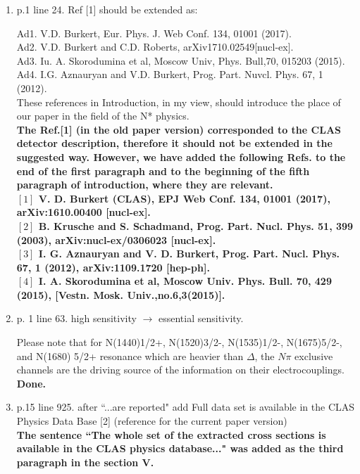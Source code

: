 \documentclass[,superscriptaddress,showpacs,amssymb,amsmath,amsfonts,linenumbers,article]{revtex4-1}
\begin{document}
\begin{enumerate}

\item p.1 line 24. Ref [1] should be extended as:

Ad1. V.D. Burkert, Eur. Phys. J. Web Conf. 134, 01001 (2017).\\
Ad2. V.D. Burkert and C.D. Roberts, arXiv1710.02549[nucl-ex].\\
Ad3. Iu. A. Skorodumina et al, Moscow Univ, Phys. Bull,70, 015203 (2015).\\
Ad4. I.G. Aznauryan and V.D. Burkert, Prog. Part. Nuvcl. Phys. 67, 1 (2012).\\[0.5cm]

These references in Introduction, in my view, should introduce the place of our paper in the field of the N* physics.\\
{\bf The Ref.[1] (in the old paper version) corresponded to the CLAS detector description, therefore it should not be extended in the suggested way. However, we have added the following Refs. to the end of the first paragraph and to the beginning of the fifth paragraph of introduction, where they are relevant.\\

$[1]$ V. D. Burkert (CLAS), EPJ Web Conf. 134, 01001 (2017), arXiv:1610.00400 [nucl-ex].\\
$[2]$ B. Krusche and S. Schadmand, Prog. Part. Nucl. Phys. 51, 399 (2003), arXiv:nucl-ex/0306023 [nucl-ex].\\
$[3]$ I. G. Aznauryan and V. D. Burkert, Prog. Part. Nucl. Phys. 67, 1 (2012), arXiv:1109.1720 [hep-ph].\\
$[4]$ I. A. Skorodumina et al, Moscow Univ. Phys. Bull. 70, 429 (2015), [Vestn. Mosk. Univ.,no.6,3(2015)].
}



\item p. 1 line 63. high sensitivity $\rightarrow$ essential sensitivity.

 Please note that for N(1440)1/2+, N(1520)3/2-, N(1535)1/2-, N(1675)5/2-, and N(1680) 5/2+ resonance which are heavier than $\Delta$, the $N\pi$ exclusive channels are the driving source of the information on their electrocouplings.\\
{\bf Done.} 


\item p.15 line 925. after ``...are reported" add
Full data set is available in the CLAS Physics Data Base [2] (reference for the current paper version)\\
{\bf The sentence ``The whole set of the extracted cross sections is available in the CLAS physics database..." was added as the third paragraph in the section V.} 



\end{enumerate}
\end{document}
